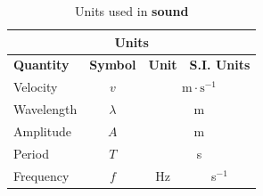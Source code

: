 \begin{table}[H]
\begin{center}
\begin{tabular}{|l|c|c|c|}\hline \hline 
\multicolumn{4}{|c|}{\textbf{Units}}\\ \hline \hline
\textbf{Quantity} & \textbf{Symbol} & \textbf{Unit} & \textbf{S.I. Units}\\ \hline
Velocity & $v$ & \multicolumn{2}{|c|}{$\text{m}\cdot\text{s}^{-1}$} \\ \hline
Wavelength & $\lambda$ & \multicolumn{2}{|c|}{m} \\ \hline
Amplitude & $A$ & \multicolumn{2}{|c|}{m} \\ \hline
Period & $T$ & \multicolumn{2}{|c|}{s} \\ \hline
Frequency & $f$ & Hz & s$^{-1}$ \\ \hline
\end{tabular}
\end{center}
\caption{Units used in \textbf{sound} }
\label{table:sound::units}
\end{table} 


